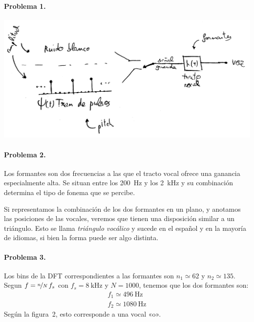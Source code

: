 


\startpage

\paragraph{Problema 1.} \hspace{1em}

\includegraphics[width=\textwidth]{T1-p1}

\finishpage


\startpage
\paragraph{Problema 2.}

Los formantes son dos frecuencias a las que el tracto vocal ofrece una ganancia
especialmente alta. Se situan entre los \SI{200}{\hertz} y los \SI{2}{\kilo\hertz}
y su combinación determina el tipo de fonema que se percibe.

Si representamos la combinación de los dos formantes en un plano, y anotamos
las posiciones de las vocales, veremos que tienen una disposición similar a un
triángulo. Esto se llama \emph{triángulo vocálico} y sucede en el español y en
la mayoría de idiomas, si bien la forma puede ser algo
distinta.

\finishpage


\startpage
\paragraph{Problema 3.}

Los bins de la DFT correspondientes a las formantes son $n_1 \simeq 62$ y
$n_2 \simeq 135$. Segun $f = \nicefrac{n}{N} \, f_s$ con $f_s =
\SI{8}{\kilo\hertz}$ y $N = \num{1000}$, tenemos que los dos formantes son:
%
\begin{align*}
  f_1 \simeq \SI{496}{\hertz}
\\
  f_2 \simeq \SI{1080}{\hertz}
\end{align*}
%
Según la figura~2, esto corresponde a una vocal «o».

